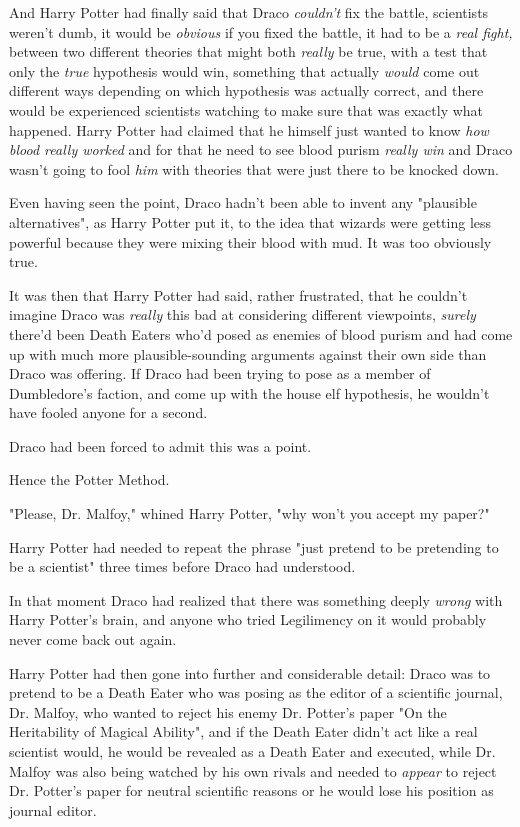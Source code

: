 And Harry Potter had finally said that Draco \emph{couldn't} fix the battle, 
scientists weren't dumb, it would be \emph{obvious} if you fixed the battle, it 
had to be a \emph{real fight,} between two different theories that might both 
\emph{really} be true, with a test that only the \emph{true} hypothesis would 
win, something that actually \emph{would} come out different ways depending on 
which hypothesis was actually correct, and there would be experienced 
scientists watching to make sure that was exactly what happened. Harry Potter 
had claimed that he himself just wanted to know \emph{how blood really worked} 
and for that he need to see blood purism \emph{really win} and Draco wasn't 
going to fool \emph{him} with theories that were just there to be knocked down.

Even having seen the point, Draco hadn't been able to invent any "plausible 
alternatives", as Harry Potter put it, to the idea that wizards were getting 
less powerful because they were mixing their blood with mud. It was too 
obviously true.

It was then that Harry Potter had said, rather frustrated, that he couldn't 
imagine Draco was \emph{really} this bad at considering different viewpoints, 
\emph{surely} there'd been Death Eaters who'd posed as enemies of blood purism 
and had come up with much more plausible-sounding arguments against their own 
side than Draco was offering. If Draco had been trying to pose as a member of 
Dumbledore's faction, and come up with the house elf hypothesis, he wouldn't 
have fooled anyone for a second.

Draco had been forced to admit this was a point.

Hence the Potter Method.

"Please, Dr. Malfoy," whined Harry Potter, "why won't you accept my paper?"

Harry Potter had needed to repeat the phrase "just pretend to be pretending to 
be a scientist" three times before Draco had understood.

In that moment Draco had realized that there was something deeply \emph{wrong} 
with Harry Potter's brain, and anyone who tried Legilimency on it would 
probably never come back out again.

Harry Potter had then gone into further and considerable detail: Draco was to 
pretend to be a Death Eater who was posing as the editor of a scientific 
journal, Dr. Malfoy, who wanted to reject his enemy Dr. Potter's paper "On the 
Heritability of Magical Ability", and if the Death Eater didn't act like a real 
scientist would, he would be revealed as a Death Eater and executed, while Dr. 
Malfoy was also being watched by his own rivals and needed to \emph{appear} to 
reject Dr. Potter's paper for neutral scientific reasons or he would lose his 
position as journal editor.

